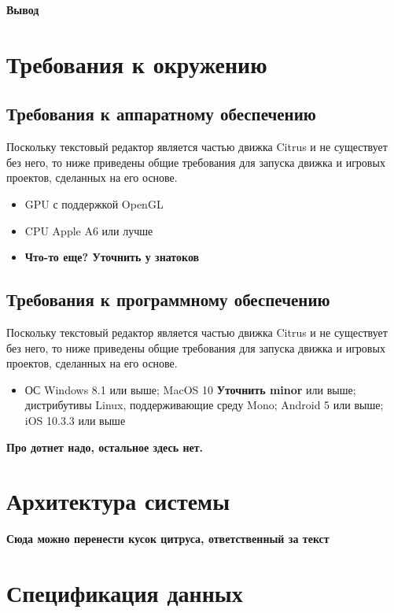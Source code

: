 \documentclass{fefu}
\begin{document}
		\par \textbf{Вывод}
	\section{Требования к окружению}
		\subsection{Требования к аппаратному обеспечению}
			\par Поскольку текстовый редактор является частью движка Citrus и не существует 
			без него, то ниже приведены общие требования для запуска движка и игровых проектов,
			сделанных на его основе.
			\begin{itemize}
				\item GPU с поддержкой OpenGL
				\item CPU Apple A6  или лучше
				\item \textbf{Что-то еще? Уточнить у знатоков}
			\end{itemize}
		\subsection{Требования к программному обеспечению}
			\par Поскольку текстовый редактор является частью движка Citrus и не существует 
			без него, то ниже приведены общие требования для запуска движка и игровых проектов,
			сделанных на его основе.
			\begin{itemize}
				\item ОС Windows 8.1 или выше; MacOS 10 \textbf{Уточнить minor} или выше; дистрибутивы 
				Linux, поддерживающие среду Mono; Android 5 или выше; iOS 10.3.3 или выше
			\end{itemize}
			\textbf{Про дотнет надо, остальное здесь нет.}
	\section{Архитектура системы}
		\par \textbf{Сюда можно перенести кусок цитруса, ответственный за текст}
	\section{Спецификация данных}
\end{document}
